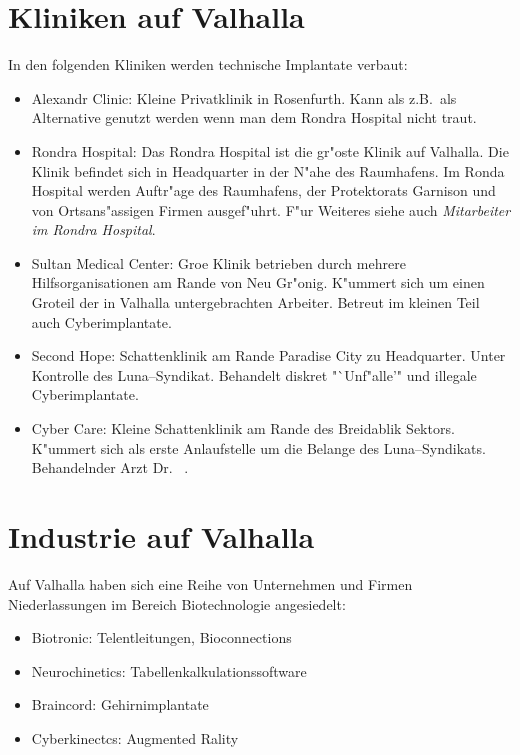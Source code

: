 \section{Kliniken auf Valhalla}

In den folgenden Kliniken werden technische Implantate verbaut:

\begin{itemize}
    \item Alexandr Clinic: Kleine Privatklinik in Rosenfurth. Kann als z.B.~als Alternative genutzt werden wenn man dem Rondra Hospital nicht traut.
    \item Rondra Hospital: Das Rondra Hospital ist die gr"os\3te Klinik auf Valhalla. Die Klinik befindet sich in Headquarter in der N"ahe des Raumhafens. Im Ronda Hospital werden Auftr"age des Raumhafens, der Protektorats Garnison und von Ortsans"assigen Firmen ausgef"uhrt. F"ur Weiteres siehe auch \emph{Mitarbeiter im Rondra Hospital}. 
    \item Sultan Medical Center: Gro\3e Klinik betrieben durch mehrere Hilfsorganisationen am Rande von Neu Gr"onig. K"ummert sich um einen Gro\3teil der in Valhalla untergebrachten Arbeiter. Betreut im kleinen Teil auch Cyberimplantate.
    \item Second Hope: Schattenklinik am Rande Paradise City zu Headquarter. Unter Kontrolle des Luna--Syndikat. Behandelt diskret "`Unf"alle'" und illegale Cyberimplantate.
    \item {} Cyber Care: Kleine Schattenklinik am Rande des Breidablik Sektors. K"ummert sich als erste Anlaufstelle um die Belange des Luna--Syndikats. Behandelnder Arzt Dr.~ .
\end{itemize}

\section{Industrie auf Valhalla}

Auf Valhalla haben sich eine Reihe von Unternehmen und Firmen Niederlassungen im Bereich Biotechnologie angesiedelt:

\begin{itemize}
    \item Biotronic: Telentleitungen, Bioconnections
    \item Neurochinetics: Tabellenkalkulationssoftware
    \item Braincord: Gehirnimplantate
    \item Cyberkinectcs: Augmented Rality
\end{itemize}

